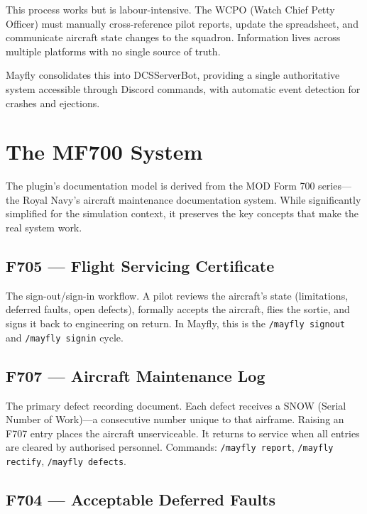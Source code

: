 \documentclass[10pt,a4paper,twocolumn]{article}
\begin{document}
This process works but is labour-intensive. The WCPO (Watch Chief Petty Officer) must manually cross-reference pilot reports, update the spreadsheet, and communicate aircraft state changes to the squadron. Information lives across multiple platforms with no single source of truth.

Mayfly consolidates this into DCSServerBot, providing a single authoritative system accessible through Discord commands, with automatic event detection for crashes and ejections.

\section{The MF700 System}

The plugin's documentation model is derived from the MOD Form 700 series---the Royal Navy's aircraft maintenance documentation system. While significantly simplified for the simulation context, it preserves the key concepts that make the real system work.

\subsection{F705 --- Flight Servicing Certificate}

The sign-out/sign-in workflow. A pilot reviews the aircraft's state (limitations, deferred faults, open defects), formally accepts the aircraft, flies the sortie, and signs it back to engineering on return. In Mayfly, this is the \texttt{/mayfly signout} and \texttt{/mayfly signin} cycle.

\subsection{F707 --- Aircraft Maintenance Log}

The primary defect recording document. Each defect receives a SNOW (Serial Number of Work)---a consecutive number unique to that airframe. Raising an F707 entry places the aircraft unserviceable. It returns to service when all entries are cleared by authorised personnel. Commands: \texttt{/mayfly report}, \texttt{/mayfly rectify}, \texttt{/mayfly defects}.

\subsection{F704 --- Acceptable Deferred Faults}
\end{document}
